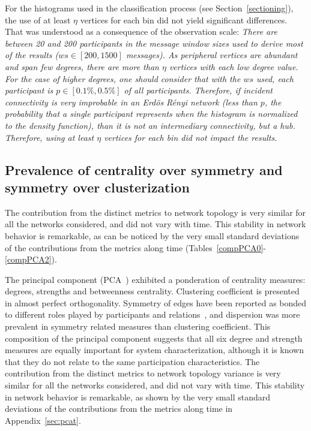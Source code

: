 \documentclass[%
 aip,
 jmp,%
 amsmath,amssymb,
 reprint,%
]{revtex4-1}
\begin{document}
For the histograms used in the classification process (see Section~\ref{sectioning}), the use of at least $\eta$ vertices for each bin did not yield significant differences.
That was understood as a consequence of the observation scale:
\emph{There are between 20 and 200 participants in the message window sizes used to derive most of the results ($ws \in [200,1500]$ messages). As peripheral vertices are abundant and span few degrees, there are more than $\eta$ vertices with each low degree value. For the case of higher degrees, one should consider that with the $ws$ used, each participant is $p \in [0.1\%,0.5\%]$ of all participants. Therefore, if incident connectivity is very improbable in an Erd\"os R\'enyi network (less than $p$, the probability that a single participant represents when the histogram is normalized to the density function), than it is not an intermediary connectivity, but a hub. Therefore, using at least $\eta$ vertices for each bin did not impact the results.}



    \subsection{Prevalence of centrality over symmetry and symmetry over clusterization}\label{prevalence}
The contribution from the distinct metrics to network topology 
is very similar for all the networks considered, and did not vary with time.
 This stability in network behavior is remarkable, as can be noticed by the very 
small standard deviations of the contributions from the metrics along time (Tables~\ref{compPCA0}-\ref{compPCA2}).

The principal component (PCA~\cite{pca}) exhibited a ponderation of centrality measures: degrees, strengths and betweenness centrality. Clustering coefficient is presented in almost perfect orthogonality.
Symmetry of edges have been reported as bonded to different roles played by participants and relations~\cite{newmanEvolving}, and dispersion was more prevalent in symmetry related measures than clustering coefficient.
This composition of the principal component suggests that all six degree and strength measures are equally important for system characterization, although it is known that they do not relate to the same participation characteristics.
The contribution from the distinct metrics to network topology variance is very similar for all the networks considered, and did not vary with time. This stability in network behavior is remarkable, as shown by the very small standard deviations of the contributions from the metrics along time in Appendix~\ref{sec:pcat}.
\end{document}
